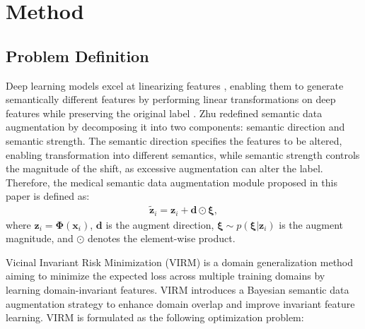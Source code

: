 \section{Method}
\label{sec:method}

\subsection{Problem Definition}
\label{sec:medvirm}

Deep learning models excel at linearizing features \cite{upchurch2017deep}, enabling them to generate semantically different features by performing linear transformations on deep features while preserving the original label \cite{ISDA}. Zhu \etal \cite{zhu2024bayesian} redefined semantic data augmentation by decomposing it into two components: semantic direction and semantic strength. The semantic direction specifies the features to be altered, enabling transformation into different semantics, while semantic strength controls the magnitude of the shift, as excessive augmentation can alter the label.
Therefore, the medical semantic data augmentation module proposed in this paper is defined as:
\begin{equation}
	\begin{aligned}
		\tilde{\mathbf{z}}_i = \mathbf{z}_i + \mathbf{d} \odot \mathbf{\xi},
	\end{aligned}
	\label{eq:sda}
\end{equation}
where $\mathbf{z}_i = \mathbf{\Phi}(\mathbf{x}_i)$, $\mathbf{d}$ is the augment direction, $\mathbf{\xi} \sim p(\mathbf{\xi}|\mathbf{z}_i)$ is the augment magnitude, and $\odot$ denotes the element-wise product.

Vicinal Invariant Risk Minimization (VIRM) \cite{zhu2024enlarging} is a domain generalization method aiming to minimize the expected loss across multiple training domains by learning domain-invariant features. VIRM introduces a Bayesian semantic data augmentation \cite{zhu2024bayesian} strategy to enhance domain overlap and improve invariant feature learning. VIRM is formulated as the following optimization problem:

